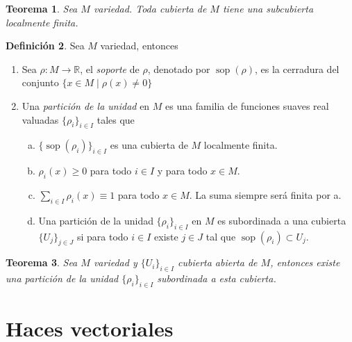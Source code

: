 \documentclass{report}
\newtheorem{theorem}{Teorema}[section]
\theoremstyle{definition}
\newtheorem{defi}[theorem]{Definici\'on}
\DeclareMathOperator{\sop}{sop}
\begin{document}
\begin{theorem}
Sea $M$ variedad. Toda cubierta de $M$ tiene una subcubierta localmente finita.

\end{theorem}

\begin{defi}
Sea $M$ variedad, entonces
\begin{enumerate}
\item Sea $\rho : M \to \mathbb{R}$, el \textit{soporte} de $\rho$, denotado por $\sop(\rho )$, es la cerradura del conjunto $ \{x \in M \mid \rho (x) \neq 0\} $
\item Una \textit{partici\'on de la unidad} en $M$ es una familia de funciones suaves real valuadas $\{ \rho_i \}_{i \in I}$ tales que  
\begin{enumerate}[a.]
\item $\{ \sop (\rho_i) \}_{i \in I}$ es una cubierta de $M$ localmente finita.
\item $\rho_i (x) \geq 0$ para todo $i \in I$ y para todo $x \in M$.
\item $\sum\limits_{i \in I} \rho_i (x) \equiv 1$ para todo $x \in M$. La suma siempre ser\'a finita por a.
\item Una partici\'on de la unidad $ \{ \rho_i \}_{i \in I}$ en $M$ es subordinada a una cubierta $\{ U_j \}_{j \in J}$ si para todo $i \in I$ existe $j \in J$ tal que $\sop (\rho_i ) \subset U_j$.
\end{enumerate}
\end{enumerate}
\end{defi}

\begin{theorem}
Sea $M$ variedad y $\{ U_i \}_{i \in I}$ cubierta abierta de $M$, entonces existe una partici\'on de la unidad $\{ \rho_i \}_{i \in I} $ subordinada a esta cubierta.
\end{theorem}
\section{Haces vectoriales}
\end{document}
